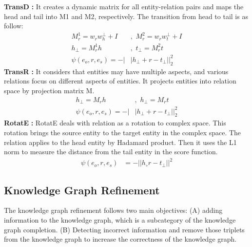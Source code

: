 \documentclass{article} \usepackage{iclr2022_conference,times}
\begin{document}
\noindent \textbf{TransD} \citep{ji2015knowledge} \textbf{:}
It creates a dynamic matrix for all entity-relation pairs and maps the head and tail into M1 and M2, respectively. The transition from head to tail is as follow:
\begin{align*}
    M^1_r  =  w_r w^ \bot_h + I \,\, &,\,\, M^2_r  =  w_r w^ \bot_t + I \\
    h_ \bot = M^1_r h \,\, &,\,\, t_ \bot = M^2_r t \\
    \psi(e_o, r, e_s) = -|&| h_ \bot + r - t_ \bot ||^2_2
\end{align*}
\noindent \textbf{TransR} \citep{lin2015learning} \textbf{:}
It considers that entities may have multiple aspects, and various relations focus on different aspects of entities. It projects entities into relation space by projection matrix M.
\begin{align*}
h_ \bot = M_r h \,\, &,\,\, h_ \bot = M_r t  \\
    \psi(e_o, r, e_s) = -|&| h_ \bot + r - t_ \bot ||^2_2
\end{align*}
\noindent \textbf{RotatE} \citep{rotate} \textbf{:}
RotatE deals with relation as a rotation to complex space. This rotation brings the source entity to the target entity in the complex space. The relation applies to the head entity by  Hadamard product. Then it uses the L1 norm to measure the distance from the tail entity in the score function.
\begin{align*}
    \psi(e_o, r, e_s) &= -|| h_ \circ r - t_ \bot ||^2
\end{align*}


\subsection{Knowledge Graph Refinement}
The knowledge graph refinement follows two main objectives: (A) adding information to the knowledge graph, which is a subcategory of the knowledge graph completion. (B) Detecting incorrect information and remove those triplets from the knowledge graph to increase the correctness of the knowledge graph.
\end{document}
